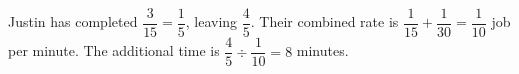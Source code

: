 Justin has completed $\dfrac{3}{15}=\dfrac{1}{5}$, leaving $\dfrac{4}{5}$. Their combined rate is $\dfrac{1}{15}+\dfrac{1}{30}=\dfrac{1}{10}$ job per minute. The additional time is $\dfrac{4}{5}\div\dfrac{1}{10}=\boxed8$ minutes.
